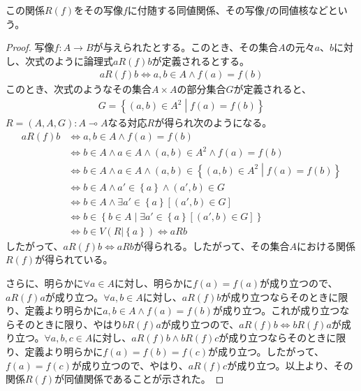 \documentclass[dvipdfmx]{jsarticle}
\begin{document}
\begin{dfn}
この関係$R(f)$をその写像$f$に付随する同値関係、その写像$f$の同値核などという。
\end{dfn}
\begin{proof}
写像$f:A \rightarrow B$が与えられたとする。このとき、その集合$A$の元々$a$、$b$に対し、次式のように論理式$aR(f)b$が定義されるとする。
\begin{align*}
aR(f)b \Leftrightarrow a,b \in A \land f(a) = f(b)
\end{align*}
このとき、次式のようなその集合$A \times A$の部分集合$G$が定義されると、
\begin{align*}
G = \left\{ (a,b) \in A^{2} \middle| f(a) = f(b) \right\}
\end{align*}
$R = (A,A,G):A \multimap A$なる対応$R$が得られ次のようになる。
\begin{align*}
aR(f)b &\Leftrightarrow a,b \in A \land f(a) = f(b)\\
&\Leftrightarrow b \in A \land a \in A \land (a,b) \in A^{2} \land f(a) = f(b)\\
&\Leftrightarrow b \in A \land a \in A \land (a,b) \in \left\{ (a,b) \in A^{2} \middle| f(a) = f(b) \right\}\\
&\Leftrightarrow b \in A \land a' \in \left\{ a \right\} \land \left( a',b \right) \in G\\
&\Leftrightarrow b \in A \land \exists a' \in \left\{ a \right\}\left[ \left( a',b \right) \in G \right]\\
&\Leftrightarrow b \in \left\{ b \in A \middle| \exists a' \in \left\{ a \right\}\left[ \left( a',b \right) \in G \right] \right\}\\
&\Leftrightarrow b \in V\left( R|\left\{ a \right\} \right) \Leftrightarrow aRb
\end{align*}
したがって、$aR(f)b \Leftrightarrow aRb$が得られる。したがって、その集合$A$における関係$R(f)$が得られている。\par
さらに、明らかに$\forall a \in A$に対し、明らかに$f(a) = f(a)$が成り立つので、$aR(f)a$が成り立つ。$\forall a,b \in A$に対し、$aR(f)b$が成り立つならそのときに限り、定義より明らかに$a,b \in A \land f(a) = f(b)$が成り立つ。これが成り立つならそのときに限り、やはり$bR(f)a$が成り立つので、$aR(f)b \Leftrightarrow bR(f)a$が成り立つ。$\forall a,b,c \in A$に対し、$aR(f)b \land bR(f)c$が成り立つならそのときに限り、定義より明らかに$f(a) = f(b) = f(c)$が成り立つ。したがって、$f(a) = f(c)$が成り立つので、やはり、$aR(f)c$が成り立つ。以上より、その関係$R(f)$が同値関係であることが示された。
\end{proof}
\end{document}
